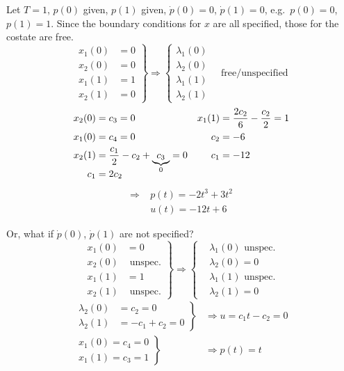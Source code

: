 \documentclass[letterpaper,12pt,titlepage]{report}
\theoremstyle{plain}
\theoremstyle{definition}
\begin{document}
Let $T=1$, $p(0)$ given, $p(1)$ given, $\dot p(0)=0$, $\dot p(1)=0$, e.g.\ $p(0)=0$, $p(1)=1$. Since the boundary conditions for $x$ are all specified, those for the costate are free.
\[
  \left.
    \begin{aligned}
      x_1(0) &= 0 \\
      x_2(0) &= 0 \\
      x_1(1) &= 1 \\
      x_2(1) &= 0
    \end{aligned} \right\}
  \Longrightarrow
  \left\{
    \begin{aligned}
      \lambda_1(0) \\
      \lambda_2(0) \\
      \lambda_1(1) \\
      \lambda_2(1)
    \end{aligned} \right.
  \quad \text{free/unspecified}
\]
\begin{alignat}{2}
  x_2(0) &= c_3 = 0 & x_1(1) &= \frac{2c_2}{6} - \frac{c_2}{2} = 1 \\
  x_1(0) &= c_4 = 0 & c_2 &= -6 \\
  x_2(1) &= \frac{c_1}{2} - c_2 + \smash{ \underbrace{c_3}_{0} } = 0 & c_1 &= -12 \\
  c_1 &= 2c_2
\end{alignat}
\begin{align}
  \Longrightarrow \; & p(t) = -2t^3 + 3t^2 \\
                     & u(t) = -12t + 6
\end{align}

Or, what if $\dot p(0)$, $\dot p(1)$ are not specified?
\[
  \left.
    \begin{aligned}
      x_1(0) &= 0 \\
      x_2(0) & \text{ unspec.} \\
      x_1(1) &= 1 \\
      x_2(1) & \text{ unspec.}
    \end{aligned} \right\}
  \Longrightarrow
  \left\{
    \begin{aligned}
      & \lambda_1(0) \text{ unspec.} \\
      & \lambda_2(0) = 0 \\
      & \lambda_1(1) \text{ unspec.} \\
      & \lambda_2(1) = 0
    \end{aligned} \right.
\]
\begin{align}
  \left.
  \begin{aligned}
    \lambda_2(0) &= c_2 = 0 \\
    \lambda_2(1) &= -c_1 + c_2 = 0
  \end{aligned}
                   \right\} & \Longrightarrow
                              u = c_1t- c_2 = 0 \\
  \left.
  \begin{aligned}
    x_1(0) = c_4 = 0 \\
    x_1(1) = c_3 = 1
  \end{aligned}
  \right\} & \Longrightarrow
             p(t) = t
\end{align}
\end{document}

